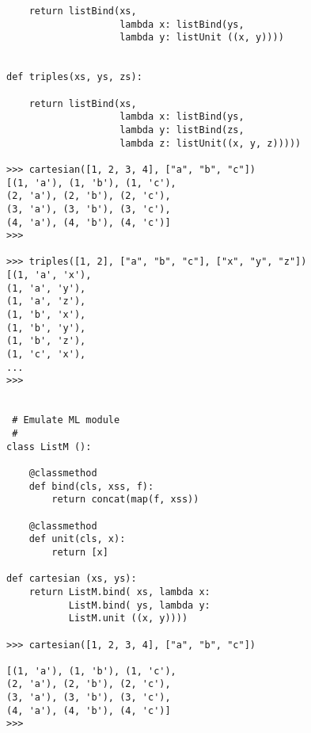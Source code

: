 \documentclass[11pt]{article}
\begin{document}
\begin{enumerate}
\begin{verbatim}
    return listBind(xs,
                    lambda x: listBind(ys,
                    lambda y: listUnit ((x, y))))


def triples(xs, ys, zs):

    return listBind(xs,
                    lambda x: listBind(ys,
                    lambda y: listBind(zs,
                    lambda z: listUnit((x, y, z)))))

>>> cartesian([1, 2, 3, 4], ["a", "b", "c"])
[(1, 'a'), (1, 'b'), (1, 'c'), 
(2, 'a'), (2, 'b'), (2, 'c'), 
(3, 'a'), (3, 'b'), (3, 'c'), 
(4, 'a'), (4, 'b'), (4, 'c')]
>>> 

>>> triples([1, 2], ["a", "b", "c"], ["x", "y", "z"])
[(1, 'a', 'x'), 
(1, 'a', 'y'), 
(1, 'a', 'z'), 
(1, 'b', 'x'), 
(1, 'b', 'y'), 
(1, 'b', 'z'), 
(1, 'c', 'x'), 
...
>>> 


 # Emulate ML module 
 #
class ListM ():

    @classmethod
    def bind(cls, xss, f):
        return concat(map(f, xss))

    @classmethod
    def unit(cls, x):
        return [x]

def cartesian (xs, ys):
    return ListM.bind( xs, lambda x:
           ListM.bind( ys, lambda y:
           ListM.unit ((x, y))))

>>> cartesian([1, 2, 3, 4], ["a", "b", "c"])

[(1, 'a'), (1, 'b'), (1, 'c'), 
(2, 'a'), (2, 'b'), (2, 'c'), 
(3, 'a'), (3, 'b'), (3, 'c'), 
(4, 'a'), (4, 'b'), (4, 'c')]
>>>
\end{verbatim}
\end{enumerate}
\end{document}

